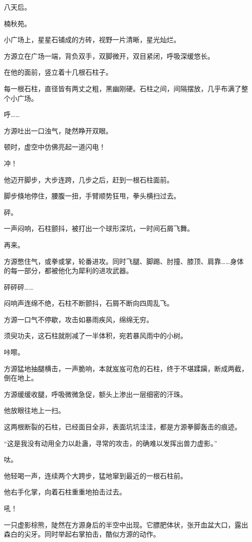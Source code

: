 
\begin{this_body}

八天后。

楠秋苑。

小广场上，星星石铺成的方砖，视野一片清晰，星光灿烂。

方源立在广场一端，背负双手，双脚微开，双目紧闭，呼吸深缓悠长。

在他的面前，竖立着十几根石柱子。

每一根石柱，直径皆有两丈之粗，黑幽刚硬。石柱之间，间隔摆放，几乎布满了整个小广场。

呼……

方源吐出一口浊气，陡然睁开双眼。

顿时，虚空中仿佛亮起一道闪电！

冲！

他迈开脚步，大步连跨，几步之后，赶到一根石柱面前。

脚步倏地停住，腰腹一扭，手臂顺势狂甩，拳头横扫过去。

砰。

一声闷响，石柱颤抖，被打出一个球形深坑，一时间石屑飞舞。

再来。

方源憋住气，或拳或掌，轮番进攻。同时飞腿、脚踢、肘撞、膝顶、肩靠……身体的每一部分，都被他化为犀利的进攻武器。

砰砰砰……

闷响声连绵不绝，石柱不断颤抖，石屑不断向四周乱飞。

方源一口气不停歇，攻击如暴雨疾风，绵绵无穷。

须臾功夫，这石柱就削减了一半体积，宛若暴风雨中的小树。

咔嚓。

方源猛地抽腿横击，一声脆响，本就岌岌可危的石柱，终于不堪蹂躏，断成两截，倒在地上。

方源缓缓收腿，呼吸微微急促，额头上渗出一层细密的汗珠。

他放眼往地上一扫。

这两根断裂的石柱，已经面目全非，表面坑坑洼洼，都是方源拳脚轰击的痕迹。

“这是我没有动用全力以赴蛊，寻常的攻击，的确难以发挥出兽力虚影。”

呔。

他轻喝一声，连续两个大跨步，猛地窜到最近的一根石柱前。

他右手化掌，向着石柱重重地拍击过去。

吼！

一只虚影棕熊，陡然在方源身后的半空中出现。它膘肥体状，张开血盆大口，露出森白的尖牙。同时举起右掌拍击，酷似方源的动作。


\end{this_body}
